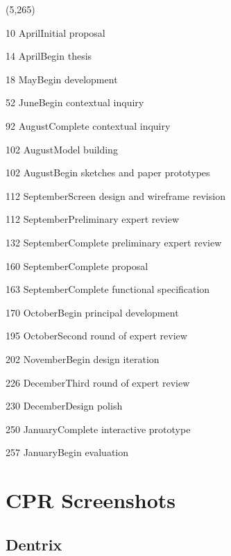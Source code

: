 \documentclass[11pt]{article}
\begin{document}
\begin{timeline}{4.2in}(5,265)
\optrule
  \item[10]{April}{Initial proposal}
  \item[14]{April}{Begin thesis}
  \item[18]{May}{Begin development}
  \item[52]{June}{Begin contextual inquiry}
  \item[92]{August}{Complete contextual inquiry}
  \item[102]{August}{Model building}
  \item[102]{August}{Begin sketches and paper prototypes}
  \item[112]{September}{Screen design and wireframe revision}
  \item[112]{September}{Preliminary expert review}
  \item[132]{September}{Complete preliminary expert review}
  \item[160]{September}{Complete proposal}
  \item[163]{September}{Complete functional specification}
  \item[170]{October}{Begin principal development}
  \item[195]{October}{Second round of expert review}
  \item[202]{November}{Begin design iteration}
  \item[226]{December}{Third round of expert review}
  \item[230]{December}{Design polish}
  \item[250]{January}{Complete interactive prototype}
  \item[257]{January}{Begin evaluation}
\end{timeline}%
\newpage

\footnotesize{
}
\newpage

\appendix
\renewcommand\thesection{Appendix \Alph{section}}

\section{CPR Screenshots}
\label{SS}
\subsection{Dentrix}
\label{dentrixplain}
\end{document}
